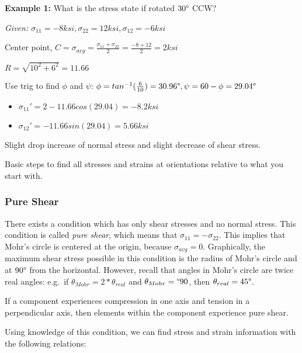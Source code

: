 \documentclass[
]{article}
\providecommand{\tightlist}{%
  \setlength{\itemsep}{0pt}\setlength{\parskip}{0pt}}
\begin{document}
\textbf{Example 1:} What is the stress state if rotated
\(30\text{\textdegree}\) CCW?

{}

\emph{Given:
\(\sigma_{11} = -8 ksi, \sigma_{22} = 12 ksi, \sigma_{12} = -6 ksi\)}

Center point,
\(C = \sigma_{avg} = \frac{\sigma_{11} + \sigma_{22}}{2} = \frac{-8 + 12}{2} = 2 ksi\)

{}

\(R = \sqrt{10^{2} + 6^{2}} = 11.66\)

{}

Use trig to find \(\phi\) and \(\psi\):
\(\phi = tan^{-1}(\frac{6}{10}) = 30.96\text{\textdegree}, \psi = 60 - \phi = 29.04\text{\textdegree}\)

\begin{itemize}
\tightlist
\item
  \(\sigma_{11}' = 2 - 11.66cos(29.04) = -8.2 ksi\)
\item
  \(\sigma_{12}' = -11.66sin(29.04) = 5.66 ksi\)
\end{itemize}

{Slight drop increase of normal stress and slight decrease of shear
stress.}

{Basic steps to find all stresses and strains at orientations relative
to what you start with.}

\hypertarget{pure-shear}{%
\subsubsection{Pure Shear}\label{pure-shear}}

There exists a condition which has only shear stresses and no normal
stress. This condition is called \textit{pure shear}, which means that
\(\sigma_{11} = -\sigma_{22}\). This implies that Mohr's circle is
centered at the origin, because \(\sigma_{avg} = 0\). Graphically, the
maximum shear stress possible in this condition is the radius of Mohr's
circle and at \(90\text{\textdegree}\) from the horizontal. However,
recall that angles in Mohr's circle are twice real angles: e.g.~if
\(\theta_{Mohr} = 2*\theta_{real}\) and
\(\theta_{Mohr} = \text{\textdegree}90\), then
\(\theta_{real} = 45\text{\textdegree}\).

{If a component experiences compression in one axis and tension in a
perpendicular axis, then elements within the component experience pure
shear.}

Using knowledge of this condition, we can find stress and strain
information with the following relations:
\end{document}
